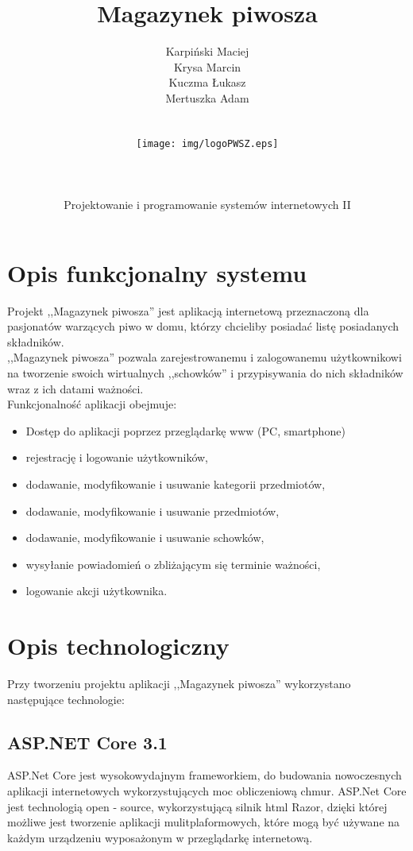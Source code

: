 \documentclass[12pt,a4paper]{article}
\author{Karpiński Maciej\\Krysa Marcin\\Kuczma Łukasz\\Mertuszka Adam\\\\\\\texttt{[image: img/logoPWSZ.eps]}\\\\\\\\Projektowanie i programowanie systemów internetowych II}
\title{Magazynek piwosza}
\begin{document}
	\maketitle
	\thispagestyle{empty}
	\clearpage

	\tableofcontents
	\newpage

	\section{Opis funkcjonalny systemu}
		\indent Projekt ,,Magazynek piwosza'' jest aplikacją internetową przeznaczoną dla pasjonatów warzących piwo w domu, którzy chcieliby posiadać listę posiadanych składników.\\
		\indent ,,Magazynek piwosza'' pozwala zarejestrowanemu i zalogowanemu użytkownikowi na tworzenie swoich wirtualnych ,,schowków'' i przypisywania do nich
		składników wraz z ich datami ważności.\\
		\indent Funkcjonalność aplikacji obejmuje:
		\begin{itemize}
			\item Dostęp do aplikacji poprzez przeglądarkę www (PC, smartphone)
			\item rejestrację i logowanie użytkowników,
			\item dodawanie, modyfikowanie i usuwanie kategorii przedmiotów,
			\item dodawanie, modyfikowanie i usuwanie przedmiotów,
			\item dodawanie, modyfikowanie i usuwanie schowków,
			\item wysyłanie powiadomień o zbliżającym się terminie ważności,
			\item logowanie akcji użytkownika.
		\end{itemize}
	\newpage

	\section{Opis technologiczny}
		\indent Przy tworzeniu projektu aplikacji ,,Magazynek piwosza'' wykorzystano następujące technologie:

		\subsection{ASP.NET Core 3.1}
			\indent ASP.Net Core jest wysokowydajnym frameworkiem, do budowania nowoczesnych aplikacji internetowych wykorzystujących moc obliczeniową chmur. ASP.Net Core jest technologią
			open - source, wykorzystującą silnik html Razor, dzięki której możliwe jest tworzenie aplikacji mulitplaformowych, które mogą być używane na każdym urządzeniu wyposażonym
			w przeglądarkę internetową.
\end{document}
